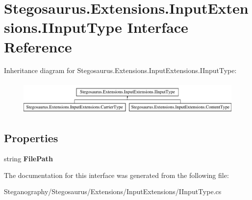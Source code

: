 \hypertarget{interface_stegosaurus_1_1_extensions_1_1_input_extensions_1_1_i_input_type}{}\section{Stegosaurus.\+Extensions.\+Input\+Extensions.\+I\+Input\+Type Interface Reference}
\label{interface_stegosaurus_1_1_extensions_1_1_input_extensions_1_1_i_input_type}
Inheritance diagram for Stegosaurus.\+Extensions.\+Input\+Extensions.\+I\+Input\+Type\+:\begin{figure}[H]
\begin{center}
\leavevmode
\includegraphics[height=1.750000cm]{interface_stegosaurus_1_1_extensions_1_1_input_extensions_1_1_i_input_type}
\end{center}
\end{figure}
\subsection*{Properties}
\begin{DoxyCompactItemize}
\item 
string {\bfseries File\+Path}\hypertarget{interface_stegosaurus_1_1_extensions_1_1_input_extensions_1_1_i_input_type_ac8dccdd490b4fc15c965eca275858476}{}\label{interface_stegosaurus_1_1_extensions_1_1_input_extensions_1_1_i_input_type_ac8dccdd490b4fc15c965eca275858476}

\end{DoxyCompactItemize}


The documentation for this interface was generated from the following file\+:\begin{DoxyCompactItemize}
\item 
Steganography/\+Stegosaurus/\+Extensions/\+Input\+Extensions/I\+Input\+Type.\+cs\end{DoxyCompactItemize}
